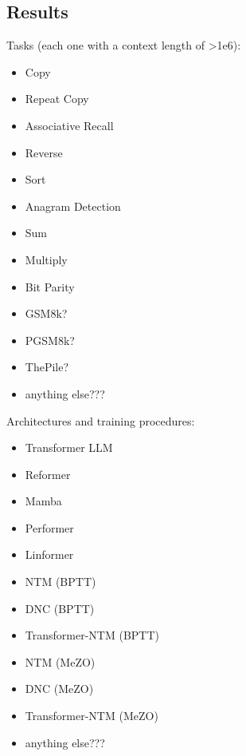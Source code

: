 \documentclass{article}
\begin{document}
\subsection{Results}
Tasks (each one with a context length of >1e6):
\begin{itemize}
            \item Copy 
            \item Repeat Copy
            \item Associative Recall
            \item Reverse
            \item Sort
            \item Anagram Detection
            \item Sum
            \item Multiply
            \item Bit Parity
            \item GSM8k?
            \item PGSM8k?
            \item ThePile?
            \item anything else???
\end{itemize}

            


Architectures and training procedures:
\begin{itemize}
    \item Transformer LLM
    \item Reformer
    \item Mamba
    \item Performer 
    \item Linformer
    \item NTM (BPTT)
    \item DNC (BPTT)
    \item Transformer-NTM (BPTT)
    \item NTM (MeZO)
    \item DNC (MeZO)
    \item Transformer-NTM (MeZO)
    \item anything else???
\end{itemize}
\end{document}
